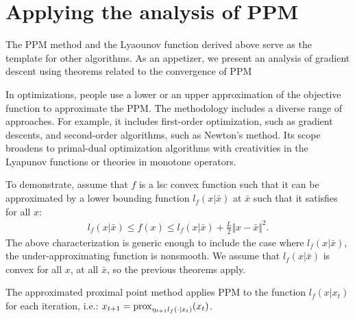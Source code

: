 \documentclass[12pt]{article}
\begin{document}
\section{Applying the analysis of PPM}
    The PPM method and the Lyaounov function derived above serve as the template for other algorithms. 
    As an appetizer, we present an analysis of gradient descent using theorems related to the convergence of PPM
    \par\noindent
    In optimizations, people use a lower or an upper approximation of the objective function to approximate the PPM. 
    The methodology includes a diverse range of approaches.
    For example, it includes first-order optimization, such as gradient descents, and second-order algorithms, such as Newton's method. 
    Its scope broadens to primal-dual optimization algorithms with creativities in the Lyapunov functions or theories in monotone operators. 
    \par\noindent
    To demonstrate, assume that $f$ is a lsc convex function such that it can be approximated by a lower bounding function $l_f(x|\bar x)$ at $\bar x$ such that it satisfies for all $x$: 
    \begin{align}
        l_f(x| \bar x) 
        \le f(x) \le l_f(x|\bar x) + \frac{L}{2}\Vert x - \bar x\Vert^2. 
    \end{align}
    The above characterization is generic enough to include the case where $l_f(x|\bar x)$, the under-approximating function is nonsmooth. 
    We assume that $l_f(x|\bar x)$ is convex for all $x$, at all $\bar x$, so the previous theorems apply. 
    \par\noindent
    The approximated proximal point method applies PPM to the function $l_f(x|x_t)$ for each iteration, i.e.: $x_{t +1} = \operatorname{prox}_{\eta_{t + 1}l_f(\cdot | x_t)}(x_t)$. 
\end{document}
